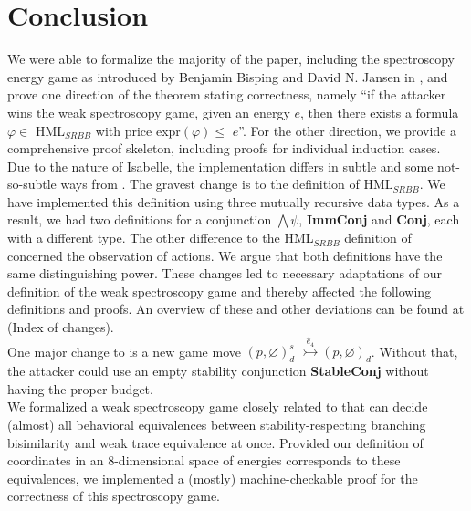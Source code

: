 \section{Conclusion}
We were able to formalize the majority of the paper, including the spectroscopy energy game as introduced by Benjamin Bisping and David N. Jansen in \cite{bisping2023lineartimebranchingtime}, 
and prove one direction of the theorem stating correctness, namely ``if the attacker wins the weak spectroscopy game, given an energy $e$, then there exists a formula $\varphi \in$ HML$_{SRBB}$ with price expr$(\varphi) \leq$ $e$''. 
For the other direction, we provide a comprehensive proof skeleton, including proofs for individual induction cases.
\\
Due to the nature of Isabelle, the implementation differs in subtle and some not-so-subtle ways from \cite{bisping2023lineartimebranchingtime}. The gravest change is to the definition of HML$_{SRBB}$. 
We have implemented this definition using three mutually recursive data types. As a result, we had two definitions for a conjunction $\bigwedge\psi$, \textbf{ImmConj} and \textbf{Conj}, each with a different type. 
The other difference to the HML$_{SRBB}$ definition of \cite{bisping2023lineartimebranchingtime} concerned the observation of actions. 
We argue that both definitions have the same distinguishing power. 
These changes led to necessary adaptations of our definition of the weak spectroscopy game and thereby affected the following definitions and proofs.
An overview of these and other deviations can be found at (Index of changes). 
\\
One major change to \cite{bisping2023lineartimebranchingtime} is a new game move $(p,\varnothing)_{d}^{s}$ $\overset{\hat{e}_4}{\rightarrowtail} (p,\varnothing)_d$. 
Without that, the attacker could use an empty stability conjunction \textbf{StableConj} without having the proper budget. 
\\
We formalized a weak spectroscopy game closely related to \cite{bisping2023lineartimebranchingtime} that can decide (almost) all behavioral equivalences between stability-respecting branching bisimilarity and weak trace equivalence at once.
Provided our definition of coordinates in an 8-dimensional space of energies corresponds to these equivalences, we implemented a (mostly) machine-checkable proof for the correctness of this spectroscopy game.